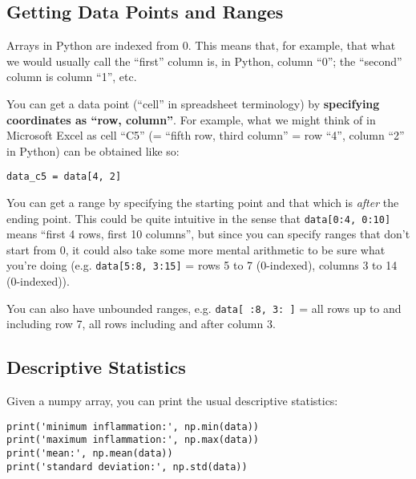 \begin{multicols*}{2}
\subsection{Getting Data Points and Ranges}
\begin{myitemize}
    \item Arrays in Python are indexed from 0. This means that, for example, that what we would usually call the ``first'' column is, in Python, column ``0''; the ``second'' column is column ``1'', etc.
    \item You can get a data point (``cell'' in spreadsheet terminology) by \textbf{specifying coordinates as ``row, column''}. For example, what we might think of in Microsoft Excel as cell ``C5'' (= ``fifth row, third column'' = row ``4'', column ``2'' in Python) can be obtained like so:
\vspace{-2mm}
\begin{verbatim}
data_c5 = data[4, 2]
\end{verbatim}
    \item You can get a range by specifying the starting point and that which is \textit{after} the ending point. This could be quite intuitive in the sense that \texttt{data[0:4, 0:10]} means ``first 4 rows, first 10 columns'', but since you can specify ranges that don't start from 0, it could also take some more mental arithmetic to be sure what you're doing (e.g. \texttt{data[5:8, 3:15]} = rows 5 to 7 (0-indexed), columns 3 to 14 (0-indexed)).
    \item You can also have unbounded ranges, e.g. \texttt{data[ :8, 3: ]} = all rows up to and including row 7, all rows including and after column 3.

\end{myitemize}

\subsection{Descriptive Statistics}
Given a numpy array, you can print the usual descriptive statistics:

\vspace{-4mm}
\begin{verbatim}
print('minimum inflammation:', np.min(data))
print('maximum inflammation:', np.max(data))
print('mean:', np.mean(data))
print('standard deviation:', np.std(data))
\end{verbatim}


\end{multicols*}
